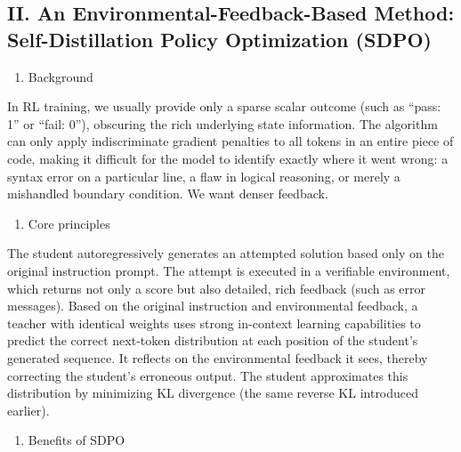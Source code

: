 \hypertarget{ii.-an-environmental-feedback-based-method-self-distillation-policy-optimization-sdpo}{%
\subsection{II. An Environmental-Feedback-Based Method: Self-Distillation Policy Optimization (SDPO)}\label{ii.-an-environmental-feedback-based-method-self-distillation-policy-optimization-sdpo}}

\begin{enumerate}
\def\labelenumi{\arabic{enumi}.}
\tightlist
\item
  Background
\end{enumerate}

In RL training, we usually provide only a sparse scalar outcome (such as ``pass: 1'' or ``fail: 0''), obscuring the rich underlying state information. The algorithm can only apply indiscriminate gradient penalties to all tokens in an entire piece of code, making it difficult for the model to identify exactly where it went wrong: a syntax error on a particular line, a flaw in logical reasoning, or merely a mishandled boundary condition. We want denser feedback.

\begin{enumerate}
\def\labelenumi{\arabic{enumi}.}
\setcounter{enumi}{1}
\tightlist
\item
  Core principles
\end{enumerate}

The student autoregressively generates an attempted solution based only on the original instruction prompt. The attempt is executed in a verifiable environment, which returns not only a score but also detailed, rich feedback (such as error messages). Based on the original instruction and environmental feedback, a teacher with identical weights uses strong in-context learning capabilities to predict the correct next-token distribution at each position of the student's generated sequence. It reflects on the environmental feedback it sees, thereby correcting the student's erroneous output. The student approximates this distribution by minimizing KL divergence (the same reverse KL introduced earlier).

\begin{enumerate}
\def\labelenumi{\arabic{enumi}.}
\setcounter{enumi}{2}
\tightlist
\item
  Benefits of SDPO
\end{enumerate}

